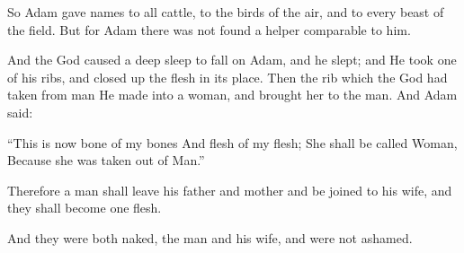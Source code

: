 \bverse So Adam gave names to all cattle, to the birds of the air, and to every beast of the field. But for Adam there was not found a helper comparable to him.

\bverse And the \lord God caused a deep sleep to fall on Adam, and he slept; and He took one of his ribs, and closed up the flesh in its place.
\bverse Then the rib which the \lord God had taken from man He made into a woman, and brought her to the man.
\bverse And Adam said: 
\begin{bquotation}
``This is now bone of my bones And flesh of my flesh; She shall be called Woman, Because she was taken out of Man.''
\end{bquotation}
\bverse Therefore a man shall leave his father and mother and be joined to his wife, and they shall become one flesh.

\bverse And they were both naked, the man and his wife, and were not ashamed.









